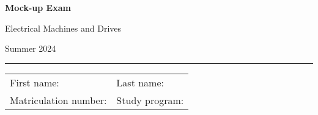 \begin{center}

    {\vspace{3mm}\Large \textbf{
    \textsf{Mock-up Exam}}
    \vspace{3mm}
    
    \LARGE
    \textsf{Electrical Machines and Drives}
    
    \vspace{6mm}
    \large
    
    Summer 2024
    \vspace{5mm}
    }
    
    
\end{center}
    
    \hrule
    
    
    \vspace{5mm}
    
\begin{flushleft}
\begin{tabular}{ll}
    First name:  \qquad \qquad \qquad  \qquad \qquad\qquad \qquad \qquad & Last name: \\[1cm]
     Matriculation number: & Study program:
\end{tabular}
\end{flushleft}


